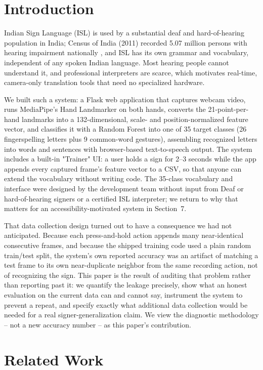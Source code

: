 \documentclass[runningheads]{llncs}
\begin{document}
\section{Introduction}

Indian Sign Language (ISL) is used by a substantial deaf and
hard-of-hearing population in India; Census of India (2011) recorded
5.07 million persons with hearing impairment nationally \cite{census2011},
and ISL has its own grammar and vocabulary, independent of any spoken
Indian language. Most hearing people cannot understand it, and
professional interpreters are scarce, which motivates real-time,
camera-only translation tools that need no specialized hardware.

We built such a system: a Flask web application that captures webcam
video, runs MediaPipe's Hand Landmarker on both hands, converts the
21-point-per-hand landmarks into a 132-dimensional, scale- and
position-normalized feature vector, and classifies it with a Random
Forest into one of 35 target classes (26 fingerspelling letters plus 9
common-word gestures), assembling recognized letters into words and
sentences with browser-based text-to-speech output. The system includes a
built-in "Trainer" UI: a user holds a sign for 2--3 seconds while the app
appends every captured frame's feature vector to a CSV, so that anyone can
extend the vocabulary without writing code. The 35-class vocabulary and
interface were designed by the development team without input from Deaf
or hard-of-hearing signers or a certified ISL interpreter; we return to
why that matters for an accessibility-motivated system in Section~7.

That data collection design turned out to have a consequence we had not
anticipated. Because each press-and-hold action appends many
near-identical consecutive frames, and because the shipped training code
used a plain random train/test split, the system's own reported accuracy
was an artifact of matching a test frame to its own near-duplicate
neighbor from the same recording action, not of recognizing the sign. This
paper is the result of auditing that problem rather than reporting past it:
we quantify the leakage precisely, show what an honest evaluation on the
current data can and cannot say, instrument the system to prevent a
repeat, and specify exactly what additional data collection would be
needed for a real signer-generalization claim. We view the diagnostic
methodology -- not a new accuracy number -- as this paper's contribution.

\section{Related Work}
\end{document}
